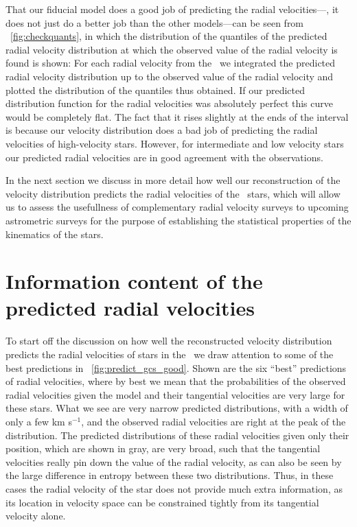 That our fiducial model does a good job of predicting the radial
velocities---\ie, it does not just do a better job than the other
models---can be seen from \figurename~\ref{fig:checkquants}, in which
the distribution of the quantiles of the predicted radial velocity
distribution at which the observed value of the radial velocity is
found is shown: For each radial velocity from the \gcsabb\ we
integrated the predicted radial velocity distribution up to the
observed value of the radial velocity and plotted the distribution of
the quantiles thus obtained. If our predicted distribution function
for the radial velocities was absolutely perfect this curve would be
completely flat. The fact that it rises slightly at the ends of the
interval is because our velocity distribution does a bad job of
predicting the radial velocities of high-velocity stars. However, for
intermediate and low velocity stars our predicted radial velocities
are in good agreement with the observations.

In the next section we discuss in more detail how well our
reconstruction of the velocity distribution predicts the radial
velocities of the \gcsabb\ stars, which will allow us to assess the
usefullness of complementary radial velocity surveys to upcoming
astrometric surveys for the purpose of establishing the statistical
properties of the kinematics of the stars.


\section{Information content of the predicted radial velocities}\label{sec:infcont}

To start off the discussion on how well the reconstructed velocity
distribution predicts the radial velocities of stars in the \gcsabb\
we draw attention to some of the best predictions in
\figurename~\ref{fig:predict_gcs_good}. Shown are the six ``best''
predictions of radial velocities, where by best we mean that the
probabilities of the observed radial velocities given the model and
their tangential velocities are very large for these stars. What we
see are very narrow predicted distributions, with a width of only a
few km s$^{-1}$, and the observed radial velocities are right at the
peak of the distribution. The predicted distributions of these radial
velocities given only their position, which are shown in gray, are
very broad, such that the tangential velocities really pin down the
value of the radial velocity, as can also be seen by the large
difference in entropy between these two distributions. Thus, in these
cases the radial velocity of the star does not provide much extra
information, as its location in velocity space can be constrained
tightly from its tangential velocity alone.

